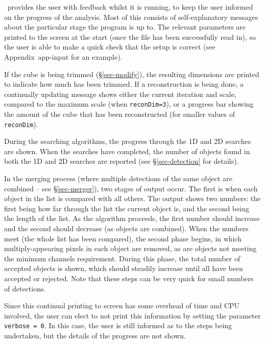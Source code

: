 \label{sec-output}


\duchamp\ provides the user with feedback whilst it is running, to
keep the user informed on the progress of the analysis. Most of this
consists of self-explanatory messages about the particular stage the
program is up to. The relevant parameters are printed to the screen at
the start (once the file has been successfully read in), so the user
is able to make a quick check that the setup is correct (see
Appendix~{app-input} for an example).

If the cube is being trimmed (\S\ref{sec-modify}), the resulting
dimensions are printed to indicate how much has been trimmed. If a
reconstruction is being done, a continually updating message shows
either the current iteration and scale, compared to the maximum scale
(when \texttt{reconDim=3}), or a progress bar showing the amount of
the cube that has been reconstructed (for smaller values of
\texttt{reconDim}).

During the searching algorithms, the progress through the 1D and 2D
searches are shown. When the searches have completed, the number of
objects found in both the 1D and 2D searches are reported (see
\S\ref{sec-detection} for details).

In the merging process (where multiple detections of the same object
are combined -- see \S\ref{sec-merger}), two stages of output
occur. The first is when each object in the list is compared with all
others. The output shows two numbers: the first being how far through
the list the current object is, and the second being the length of the
list. As the algorithm proceeds, the first number should increase and
the second should decrease (as objects are combined). When the numbers
meet (\ie the whole list has been compared), the second phase begins,
in which multiply-appearing pixels in each object are removed, as are
objects not meeting the minimum channels requirement. During this
phase, the total number of accepted objects is shown, which should
steadily increase until all have been accepted or rejected. Note that
these steps can be very quick for small numbers of detections.

Since this continual printing to screen has some overhead of time and
CPU involved, the user can elect to not print this information by
setting the parameter \texttt{verbose = 0}. In this case, the user is
still informed as to the steps being undertaken, but the details of
the progress are not shown.

